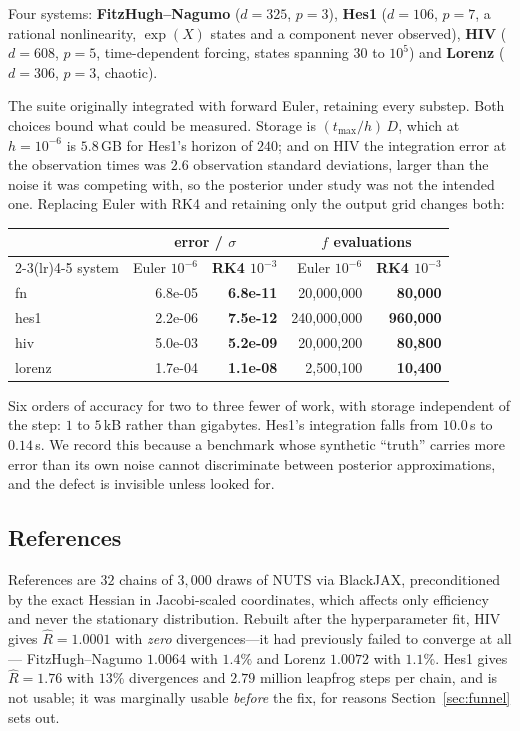 \documentclass[11pt]{article}
\newcommand{\Rhat}{\widehat{R}}
\theoremstyle{plain}
\theoremstyle{definition}
\theoremstyle{remark}
\begin{document}
Four systems: \textbf{FitzHugh--Nagumo} ($d=325$, $p=3$), \textbf{Hes1} ($d=106$, $p=7$, a
rational nonlinearity, $\exp(X)$ states and a component never observed), \textbf{HIV} ($d=608$,
$p=5$, time-dependent forcing, states spanning $30$ to $10^5$) and \textbf{Lorenz} ($d=306$,
$p=3$, chaotic).

The suite originally integrated with forward Euler, retaining every substep. Both choices bound
what could be measured. Storage is $(t_{\max}/h)\,D$, which at $h=10^{-6}$ is $5.8$\,GB for Hes1's
horizon of $240$; and on HIV the integration error at the observation times was $2.6$ observation
standard deviations, larger than the noise it was competing with, so the posterior under study was
not the intended one. Replacing Euler with RK4 and retaining only the output grid changes both:

\begin{center}\small
\begin{tabular}{lrrrr}
\toprule
& \multicolumn{2}{c}{error / $\sigma$} & \multicolumn{2}{c}{$f$ evaluations}\\
\cmidrule(lr){2-3}\cmidrule(lr){4-5}
system & Euler $10^{-6}$ & \textbf{RK4 $10^{-3}$} & Euler $10^{-6}$ & \textbf{RK4 $10^{-3}$}\\
\midrule
fn     & 6.8e-05 & \textbf{6.8e-11} & 20{,}000{,}000 & \textbf{80{,}000}\\
hes1   & 2.2e-06 & \textbf{7.5e-12} & 240{,}000{,}000 & \textbf{960{,}000}\\
hiv    & 5.0e-03 & \textbf{5.2e-09} & 20{,}000{,}200 & \textbf{80{,}800}\\
lorenz & 1.7e-04 & \textbf{1.1e-08} & 2{,}500{,}100 & \textbf{10{,}400}\\
\bottomrule
\end{tabular}
\end{center}

Six orders of accuracy for two to three fewer of work, with storage independent of the step: $1$ to
$5$\,kB rather than gigabytes. Hes1's integration falls from $10.0$\,s to $0.14$\,s. We record this
because a benchmark whose synthetic ``truth'' carries more error than its own noise cannot
discriminate between posterior approximations, and the defect is invisible unless looked for.

\subsection{References}

References are $32$ chains of $3{,}000$ draws of NUTS \cite{hoffman2014} via BlackJAX,
preconditioned by the exact Hessian in Jacobi-scaled coordinates, which affects only efficiency and
never the stationary distribution. Rebuilt after the hyperparameter fit, HIV gives
$\Rhat = 1.0001$ with \emph{zero} divergences---it had previously failed to converge at all---
FitzHugh--Nagumo $1.0064$ with $1.4\%$ and Lorenz $1.0072$ with $1.1\%$. Hes1 gives
$\Rhat = 1.76$ with $13\%$ divergences and $2.79$ million leapfrog steps per chain, and is not
usable; it was marginally usable \emph{before} the fix, for reasons Section~\ref{sec:funnel}
sets out.
\end{document}
